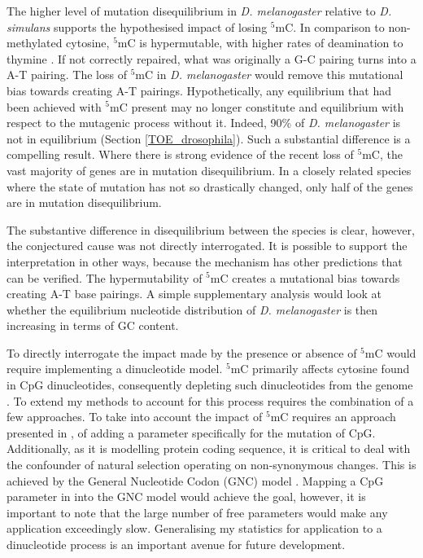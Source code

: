 The higher level of mutation disequilibrium in \textit{D. melanogaster} relative to \textit{D. simulans} supports the hypothesised impact of losing $^5$mC. In comparison to non-methylated cytosine, $^5$mC is hypermutable, with higher rates of deamination to thymine \citep{Shen1994TheDNA, Coulondre1978MolecularColi}. If not correctly repaired, what was originally a G-C pairing turns into a A-T pairing. The loss of $^5$mC in \textit{D. melanogaster} would remove this mutational bias towards creating A-T pairings. Hypothetically, any equilibrium that had been achieved with $^5$mC present may no longer constitute and equilibrium with respect to the mutagenic process without it. Indeed, 90\% of \textit{D. melanogaster} is not in equilibrium (Section \ref{TOE_drosophila}). Such a substantial difference is a compelling result. Where there is strong evidence of the recent loss of $^5$mC, the vast majority of genes are in mutation disequilibrium. In a closely related species where the state of mutation has not so drastically changed, only half of the genes are in mutation disequilibrium.

The substantive difference in disequilibrium between the species is clear, however, the conjectured cause was not directly interrogated. It is possible to support the interpretation in other ways, because the mechanism has other predictions that can be verified. The hypermutability of $^5$mC creates a mutational bias towards creating A-T base pairings. A simple supplementary analysis would look at whether the equilibrium nucleotide distribution of \textit{D. melanogaster} is then increasing in terms of GC content. 

To directly interrogate the impact made by the presence or absence of $^5$mC would require implementing a dinucleotide model. $^5$mC primarily affects cytosine found in CpG dinucleotides, consequently depleting such dinucleotides from the genome \citep{Holliday1975DNADevelopment, Bird1980DNADNA}. To extend my methods to account for this process requires the combination of a few approaches. To take into account the impact of $^5$mC requires an approach presented in \cite{Huttley2004ModelingMammals}, of adding a parameter specifically for the mutation of CpG. Additionally, as it is modelling protein coding sequence, it is critical to deal with the confounder of natural selection operating on non-synonymous changes. This is achieved by the General Nucleotide Codon (GNC) model \citep{Kaehler2017StandardData}. Mapping a CpG parameter in into the GNC model would achieve the goal, however, it is important to note that the large number of free parameters would make any application exceedingly slow. Generalising my statistics for application to a dinucleotide process is an important avenue for future development. 


